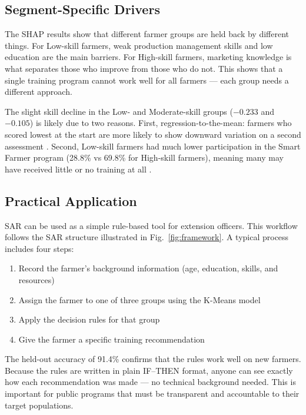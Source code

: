 \documentclass[fleqn,10pt,lineno]{wlpeerj}
\begin{document}
\subsection{Segment-Specific Drivers}

The SHAP results show that different farmer groups are held back 
by different things. For Low-skill farmers, weak production 
management skills and low education are the main barriers. For 
High-skill farmers, marketing knowledge is what separates those 
who improve from those who do not. This shows that a single 
training program cannot work well for all farmers — each group 
needs a different approach.

The slight skill decline in the Low- and Moderate-skill groups 
($-0.233$ and $-0.105$) is likely due to two reasons. First, 
regression-to-the-mean: farmers who scored lowest at the start 
are more likely to show downward variation on a second assessment 
\citep{davis2012}. Second, Low-skill farmers had much lower 
participation in the Smart Farmer program (28.8\% vs 69.8\% 
for High-skill farmers), meaning many may have received little 
or no training at all \citep{anderson2004}.

\subsection{Practical Application}

SAR can be used as a simple rule-based tool for extension officers. 
This workflow follows the SAR structure illustrated in Fig.~\ref{fig:framework}. 
A typical process includes four steps:
\begin{enumerate}
  \item Record the farmer's background information (age, 
  education, skills, and resources)
  \item Assign the farmer to one of three groups using 
  the K-Means model
  \item Apply the decision rules for that group
  \item Give the farmer a specific training recommendation
\end{enumerate}

The held-out accuracy of 91.4\% confirms that the rules work 
well on new farmers. Because the rules are written in plain 
IF--THEN format, anyone can see exactly how each recommendation 
was made — no technical background needed. This is important 
for public programs that must be transparent and accountable 
to their target populations.
\end{document}
